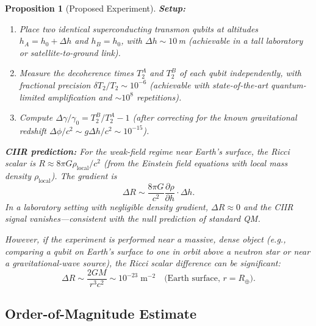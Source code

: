 \documentclass[11pt,a4paper]{article}
\newtheorem{proposition}[definition]{Proposition}
\theoremstyle{remark}
\begin{document}
\begin{proposition}[Proposed Experiment]
\label{prop:experiment}
\textbf{Setup:}
\begin{enumerate}
  \item Place two identical superconducting transmon qubits at
    altitudes $h_A = h_0 + \Delta h$ and $h_B = h_0$, with
    $\Delta h \sim 10$\,m (achievable in a tall laboratory or
    satellite-to-ground link).
  \item Measure the decoherence times $T_2^A$ and $T_2^B$ of each
    qubit independently, with fractional precision
    $\delta T_2 / T_2 \sim 10^{-6}$ (achievable with state-of-the-art
    quantum-limited amplification and $\sim 10^8$ repetitions).
  \item Compute $\Delta\gamma / \gamma_0 = T_2^B / T_2^A - 1$
    (after correcting for the known gravitational redshift
    $\Delta\phi / c^2 \sim g \Delta h / c^2 \sim 10^{-15}$).
\end{enumerate}

\textbf{CIIR prediction:}
For the weak-field regime near Earth's surface, the Ricci scalar is
$R \approx 8\pi G \rho_{\mathrm{local}} / c^2$ (from the Einstein
field equations with local mass density $\rho_{\mathrm{local}}$).
The gradient is
\[
  \Delta R \sim \frac{8\pi G}{c^2} \frac{\partial\rho}{\partial h}
  \cdot \Delta h.
\]
In a laboratory setting with negligible density gradient,
$\Delta R \approx 0$ and the CIIR signal vanishes---consistent with
the null prediction of standard QM.

However, if the experiment is performed near a massive, dense object
(e.g., comparing a qubit on Earth's surface to one in orbit above a
neutron star or near a gravitational-wave source), the Ricci scalar
difference can be significant:
\[
  \Delta R \sim \frac{2GM}{r^3 c^2} \sim 10^{-23}\;\mathrm{m}^{-2}
  \quad\text{(Earth surface, $r = R_\oplus$)}.
\]
\end{proposition}

\subsection{Order-of-Magnitude Estimate}
\end{document}

